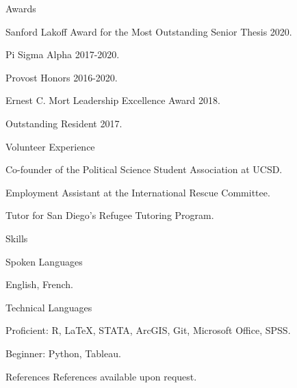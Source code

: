 \documentclass[10pt]{resume} %
\begin{document}
	
	\begin{rSection}{Awards}
		\itemsep -5pt
		\item Sanford Lakoff Award for the Most Outstanding Senior Thesis 2020.
		\item Pi Sigma Alpha 2017-2020. 
		\item Provost Honors 2016-2020. 
		\item Ernest C. Mort Leadership Excellence Award 2018. 
		\item Outstanding Resident 2017.
	\end{rSection}
	
	\begin{rSection}{Volunteer Experience} \itemsep -5pt
		\item Co-founder of the Political Science Student Association at UCSD.
		\item Employment Assistant at the International Rescue Committee.
		\item Tutor for San Diego's Refugee Tutoring Program.
	\end{rSection}
	
	\begin{rSection}{Skills} \itemsep -5pt
		\begin{rSubsection}{Spoken Languages}{}{}
			\item English, French.
		\end{rSubsection}
		\begin{rSubsection}{Technical Languages}{}{}
			\item Proficient: R, \LaTeX, STATA, ArcGIS, Git, Microsoft Office, SPSS.\\
			\item Beginner: Python, Tableau.
		\end{rSubsection}
	\end{rSection}
	
	\begin{rSection}{References}
		References available upon request. 
	\end{rSection}
	
\end{document}
